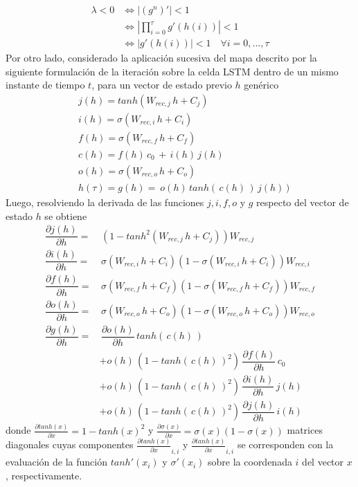 \documentclass{article}
\begin{document}
\begin{appendices}
		\begin{equation*}
		\begin{split}
		\lambda < 0 &\iff | (g^n)' | < 1\\
		&\iff  \left\lvert  \prod_{i = 0}^{\tau}g'(h(i)) \right\rvert < 1\\
		&\iff  |g'(h(i))|  < 1 \quad \forall i = 0, ... , \tau
		\end{split}
		\end{equation*}
		Por otro lado, considerado la aplicación sucesiva del mapa descrito por la siguiente formulación de la iteración sobre la celda LSTM dentro de un mismo instante de tiempo $t$, para un vector de estado previo $h$ genérico
		\begin{equation*}
		\begin{split}
		&j(h) = tanh(W_{rec,j} \, h + C_j)\\
		&i(h) = \sigma(W_{rec,i} \, h + C_i)\\
		&f(h) = \sigma(W_{rec,f} \, h + C_f)\\
		&c(h) = f(h) \, c_0 \,+\, i(h) \, j(h)\\
		&o(h) = \sigma(W_{rec,o} \, h + C_o)\\
		&h(\tau) = g(h) = \: o(h) \, tanh( \,c(h)\,) \, j(h) \, )
		\end{split}
		\end{equation*}
		Luego, resolviendo la derivada de las funciones $j, i, f, o$ y $g$ respecto del vector de estado $h$ se obtiene
		\begin{equation*}
		\begin{split}
		\dfrac{\partial j(h)}{\partial h} = & \, (1- tanh^2(W_{rec,j} \, h + C_j))W_{rec,j}\\
		\dfrac{\partial i(h)}{\partial h} = & \, \sigma(W_{rec,i} \, h + C_i) (1-\sigma(W_{rec,i} \, h + C_i)) W_{rec,i}\\
		\dfrac{\partial f(h)}{\partial h} = & \, \sigma(W_{rec,f} \, h + C_f) (1-\sigma(W_{rec,f} \, h + C_f)) W_{rec,f}\\
		\dfrac{\partial o(h)}{\partial h} = & \, \sigma(W_{rec,o} \, h + C_o) (1-\sigma(W_{rec,o} \, h + C_o)) W_{rec,o}\\
		\dfrac{\partial g(h)}{\partial h} = & \, \dfrac{\partial o(h)}{\partial h} \, tanh( \, c(h) \, )\\
		&+ o(h) \, (1 - tanh( \, c(h) \, )^2) \, \dfrac{\partial f(h)}{\partial h} \, c_0\\
		&+ o(h) \, (1 - tanh( \, c(h) \, )^2) \, \dfrac{\partial i(h)}{\partial h} \, j(h)\\
		&+ o(h) \, (1 - tanh( \, c(h) \, )^2) \, \dfrac{\partial j(h)}{\partial h} \, i(h)
		\end{split}
		\end{equation*}
		donde $\frac{\partial tanh(x)}{\partial x} = 1 - tanh(x)^2$ y $\frac{\partial \sigma(x)}{\partial x} = \sigma(x) (1-\sigma(x))$ matrices diagonales cuyas componentes $\frac{\partial tanh(x)}{\partial x}_{i,i}$ y $\frac{\partial tanh(x)}{\partial x}_{i,i}$ se corresponden con la evaluación de la función $tanh'(x_i)$ y $\sigma'(x_i)$ sobre la coordenada $i$ del vector $x$, respectivamente.\\
		

\end{appendices}
\end{document}
